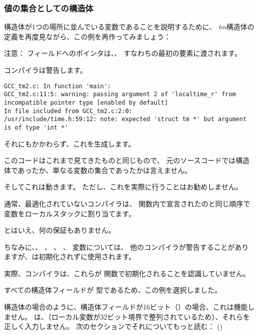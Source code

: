 ﻿\subsubsection{値の集合としての構造体}

構造体が1つの場所に並んでいる変数であることを説明するために、
\emph{tm}構造体の定義を再度見ながら、この例を再作ってみましょう：



注意：
フィールドへのポインタは、、
すなわちの最初の要素に渡されます。

コンパイラは警告します。

\begin{lstlisting}[caption=GCC 4.7.3]
GCC_tm2.c: In function 'main':
GCC_tm2.c:11:5: warning: passing argument 2 of 'localtime_r' from incompatible pointer type [enabled by default]
In file included from GCC_tm2.c:2:0:
/usr/include/time.h:59:12: note: expected 'struct tm *' but argument is of type 'int *'
\end{lstlisting}

それにもかかわらず、これを生成します。



このコードはこれまで見てきたものと同じもので、
元のソースコードでは構造体であったか、単なる変数の集合であったかは言えません。

そしてこれは動きます。
ただし、これを実際に行うことはお勧めしません。

通常、最適化されていないコンパイラは、
関数内で宣言されたのと同じ順序で変数をローカルスタックに割り当てます。

とはいえ、何の保証もありません。

ちなみに、、 、 、
、 変数については、
他のコンパイラが警告することがありますが、は初期化されずに使用されます。

実際、コンパイラは、これらが
関数で初期化されることを認識していません。

すべての構造体フィールドが \Tint 型であるため、この例を選択しました。

構造体の場合のように、構造体フィールドが16ビット（）の場合、これは機能しません。
は、（ローカル変数が32ビット境界で整列されているため）、それらを正しく入力しません。
次のセクションでそれについてもっと読む：
\q{\StructurePackingSectionName} ()


